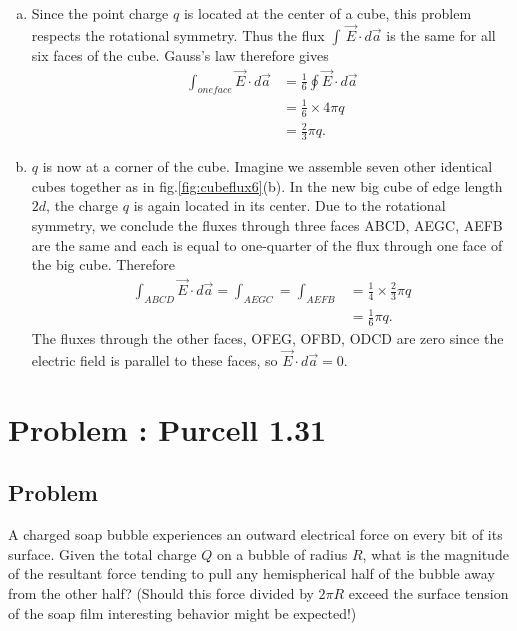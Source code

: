 \documentclass[solutions]{esg8022pset}
\begin{document}
  \begin{enumerate}[(a)]
    \item Since the point charge $q$ is located at the center of a cube,
          this problem respects the rotational symmetry.  Thus the flux
          $\int\,\vec{E}\cdot d\vec{a}$ is the same for all six faces of the
          cube.  Gauss's law therefore gives
          \begin{align*}
            \int_{one face} \vec{E}\cdot d\vec{a} & = \frac{1}{6}\oint \vec{E}\cdot d\vec{a}\\
                                                  & = \frac{1}{6}\times 4\pi q\\
                                                  & = \frac{2}{3}\pi q.
          \end{align*}
    \item $q$ is now at a corner of the cube.  Imagine we assemble seven
          other identical cubes together as in fig.\ref{fig:cubeflux6}(b).  In
          the new big cube of edge length $2d$, the charge $q$ is again located
          in its center.  Due to the rotational symmetry, we conclude the fluxes
          through three faces ABCD, AEGC, AEFB are the same and each is equal to
          one-quarter of the flux through one face of the big cube.  Therefore
          \begin{align*}
            \int_{ABCD} \vec{E}\cdot d\vec{a}=\int_{AEGC}=\int_{AEFB} & = \frac{1}{4}\times\frac{2}{3}\pi q\\
              & = \frac{1}{6}\pi q.
          \end{align*}
          The fluxes through the other faces, OFEG, OFBD, ODCD are zero since the
          electric field is parallel to these faces, so $\vec{E}\cdot d\vec{a}=0$.
  \end{enumerate}
\section{Problem \thesection: Purcell 1.31}
\subsection{Problem}
  A charged soap bubble experiences an outward electrical force on every bit of its surface. Given the total charge $Q$ on a bubble of radius $R$, what is the magnitude of the resultant force tending to pull any hemispherical half of the bubble away from the other half? (Should this force divided by $2\pi R$ exceed the surface tension of the soap film interesting behavior might be expected!)
\end{document}

